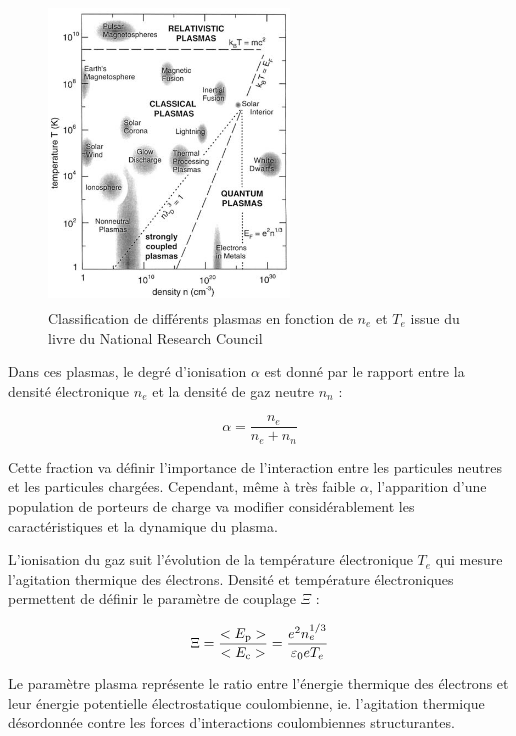 \begin{refsection}
\begin{figure}[htbp]
\centering
\includegraphics[height=80mm,width=64mm]{figures/1-zoologie.png}{\caption{Classification
de différents plasmas en fonction de $n_e$ et $T_e$ issue du livre du National
Research Council \parencite{NRC}}\label{zoologie}}
\end{figure}

Dans ces plasmas, le degré d'ionisation $\alpha$ est donné par le rapport
entre la densité électronique $n_{e}$ et la densité de gaz neutre
$n_{n}$ :

\begin{equation}
\alpha=\frac{n_{e}}{n_{e}+n_{n}}
\end{equation}

Cette fraction va définir l'importance de l'interaction entre les particules
neutres et les particules chargées. Cependant, même à très faible $\alpha$,
l'apparition d'une population de porteurs de charge va modifier considérablement 
les caractéristiques et la dynamique du plasma.

L'ionisation du gaz suit l'évolution de la température électronique $T_{e}$
qui mesure l'agitation thermique des électrons. Densité et température
électroniques permettent de définir le paramètre de couplage $\Xi$ :

\begin{equation}
\label{1-paramPlasma}
\Xi=\frac{<E_\text{p}>}{<E_\text{c}>}=\frac{e^{{2}}
n_{e}^{{1/3}}}{\varepsilon{_{0}} eT_{e}}
\end{equation}

Le paramètre plasma représente le ratio entre l'énergie thermique des
électrons et leur énergie potentielle électrostatique coulombienne, ie.
l'agitation thermique désordonnée contre les forces d'interactions
coulombiennes structurantes.


\end{refsection}
